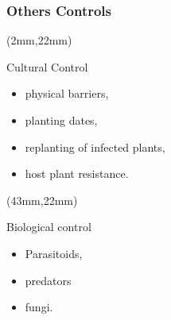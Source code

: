 \begin{frame}[plain]
	\frametitle{Others Controls}
	{
		\begin{textblock*}{40mm}(2mm,22mm)	
			\begin{graybox}{Cultural Control}
				\begin{itemize}
					\item<1-> physical barriers,
					\item<2-> planting dates,
					\item<3->\textcolor{redstrong}{replanting of infected plants},
					\item<4-> host plant resistance.
				\end{itemize}
			\end{graybox}
		\end{textblock*}
	}
	{
		\begin{textblock*}{40mm}(43mm,22mm)
			\begin{graybox}{Biological control}
				\begin{itemize}
					\item<5-> Parasitoids,
					\item<6-> predators
					\item<7-> fungi.
				\end{itemize}
			\end{graybox}
		\end{textblock*}
	}
\end{frame}
